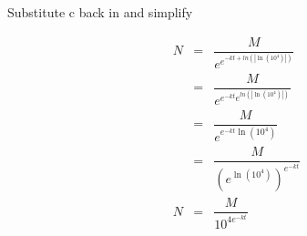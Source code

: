 Substitute c back in and simplify

\begin{eqnarray*}
N &=& \dfrac{M}{e^{e^{-kt + ln\left(\left|\ln\left({10^4}\right)\right|\right)}}} \\
  &=& \dfrac{M}{e^{e^{-kt} e^{ln\left(\left|\ln\left({10^4}\right)\right|\right)}}} \\
  &=& \dfrac{M}{e^{e^{-kt} \ln\left({10^4}\right)}} \\
  &=& \dfrac{M}{(e^{\ln\left({10^4}\right)})^{e^{-kt}}} \\
N  &=& \dfrac{M}{10^{4e^{-kt}}}
\end{eqnarray*}

\clearpage